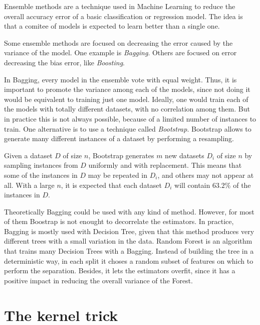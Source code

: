   \begin{pre-delivery}
    Ensemble methods are a technique used in Machine Learning to reduce the
    overall accuracy error of a basic classification or regression model. The
    idea is that a comitee of models is expected to learn better than a single
    one.

    Some ensemble methods are focused on decreasing the error caused by the
    variance of the model. One example is \textit{Bagging}. Others are focused
    on error decreasing the bias error, like \textit{Boosting}.

    In Bagging, every model in the ensemble vote with equal weight. Thus, it is
    important to promote the variance among each of the models, since not doing
    it would be equivalent to training just one model. Ideally, one would train
    each of the models with totally different datasets, with no correlation
    among them. But in practice this is not always possible, because of a
    limited number of instances to train. One alternative is to use a
    technique called \textit{Bootstrap}. Bootstrap allows to generate
    many different instances of a dataset by performing a resampling.

    Given a dataset $D$ of size $n$, Bootstrap generates $m$ new datasets
    $D_i$ of size $n$ by sampling instances from $D$ uniformly and with
    replacement. This means that some of the instances in $D$ may be repeated
    in $D_i$, and others may not appear at all. With a large $n$, it is expected
    that each dataset $D_i$ will contain $63.2 \% $ of the instances in $D$.

    Theoretically Bagging could be used with any kind of method. However, for
    most of them Boostrap is not enought to decorrelate the estimators.
    In practice, Bagging is mostly used with Decision Tree, given that this
    method produces very different trees with a small variation in the data.
    Random Forest is an algorithm that trains many Decision Trees with a
    Bagging. Instead of building the tree in a deterministic way, in each
    split it choses a random subset of features on which to perform the
    separation. Besides, it lets the estimators overfit, since it has a positive
    impact in reducing the overall variance of the Forest.
  \end{pre-delivery}

\section{The kernel trick}
\label{sec:kern-trick}




